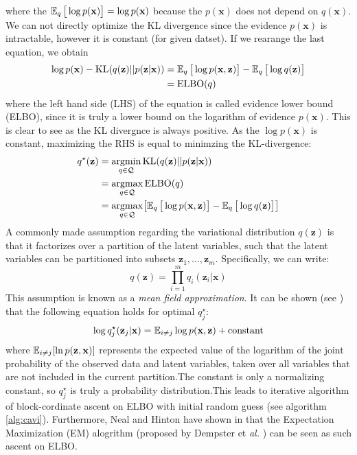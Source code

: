 where the $\operatorname{\mathbb{E}}_q \big[\log p(\mathbf{x})\big] = \log p(\mathbf{x})$ because the $p(\mathbf{x})$ does not depend on $q(\mathbf{x})$. 
We can not directly optimize the KL divergence since the evidence $p(\mathbf{x})$ is intractable, however it is constant (for given datset).
If we rearange the last equation, we obtain 
\begin{align}
\log p(\mathbf{x}) - \mathrm{KL}(q(\mathbf{z}) || p(\mathbf{z} | \mathbf{x})) &= \operatorname{\mathbb{E}}_q \big[\log p(\mathbf{x},\mathbf{z})\big] - \operatorname{\mathbb{E}}_q \big[\log q(\mathbf{z})\big] \\
    &= \mathrm{ELBO}(q)
\end{align}
where the left hand side (LHS) of the equation is called evidence lower bound (ELBO), since it is truly a lower bound on the logarithm of evidence 
$p(\mathbf{x})$. This is clear to see as the KL divergnce is always positive. As the $\log p(\mathbf{x})$ is constant, maximizing the RHS is 
equal to minimzing the KL-divergence:
\begin{align*} 
    q^\star(\mathbf{z}) &= \mathop{\rm argmin}_{q \in \mathcal{Q}} \mathrm{KL}(q(\mathbf{z}) || p(\mathbf{z} | \mathbf{x})) \\
                        &= \mathop{\rm argmax}_{q \in \mathcal{Q}} \mathrm{ELBO}(q) \\
                        &= \mathop{\rm argmax}_{q \in \mathcal{Q}} \bigl[ \operatorname{\mathbb{E}}_q \big[\log p(\mathbf{x},\mathbf{z})\big] - \operatorname{\mathbb{E}}_q \big[\log q(\mathbf{z})\big] \bigr]  \\
\end{align*}
A commonly made assumption regarding the variational distribution $q(\mathbf{z})$ is that it factorizes over a partition of the latent variables, 
such that the latent variables can be partitioned into subsets $\mathbf{z}_1,\dots,\mathbf{z}_m$. Specifically, we can write:
$$
q(\mathbf{z}) = \prod_{i=1}^m q_i(\mathbf{z}_i|\mathbf{x})
$$
This assumption is known as a \textit{mean field approximation}. It can be shown (see \cite{intro-variational-blog-2019}) that the following 
equation holds for optimal $q^\star_j$: 
$$
\log q^\star_j(\mathbf{z}_j|\mathbf{x}) = \operatorname{\mathbb{E}}_{i \neq j} \log p(\mathbf{x},\mathbf{z}) + \text{constant}
$$
where $\operatorname{\mathbb{E}}_{{i\neq j}}[\ln p({\mathbf {z}},{\mathbf {x}})]$ represents the expected value of the logarithm of the joint probability 
of the observed data and latent variables, taken over all variables that are not included in the current partition.The constant is 
only a normalizing constant, so $q^\star_j$ is truly a probability distribution.This leads to iterative 
algorithm of block-cordinate ascent on ELBO with initial random guess (see algorithm \ref{alg:cavi}). Furthermore, Neal and Hinton
have shown in \cite{em-as-vb-1998} that the Expectation Maximization (EM) alogrithm (proposed by Dempster et \textit{al.} \cite{em-alg-1977}) 
can be seen as such ascent on ELBO. 

